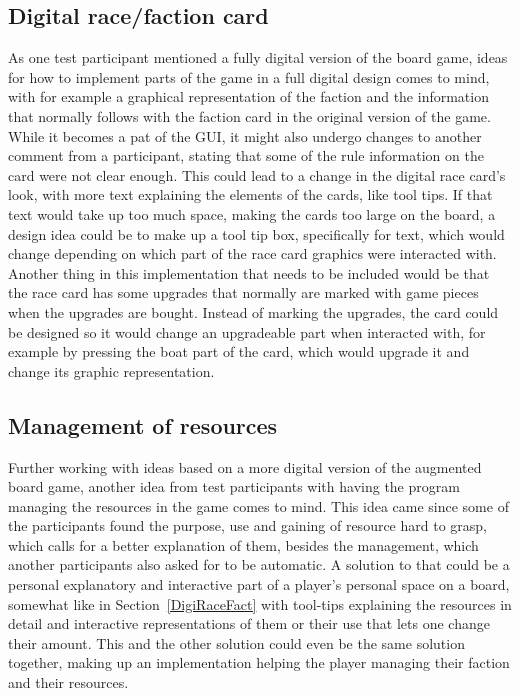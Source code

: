 \subsection{Digital race/faction card}\label{sec:DigiRaceFact}
As one test participant mentioned a fully digital version of the board game, ideas for how to implement parts of the game in a full digital design comes to mind, with for example a graphical representation of the faction and the information that normally follows with the faction card in the original version of the game. While it becomes a pat of the GUI, it might also undergo changes to another comment from a participant, stating that some of the rule information on the card were not clear enough. This could lead to a change in the digital race card's look, with more text explaining the elements of the cards, like tool tips. If that text would take up too much space, making the cards too large on the board, a design idea could be to make up a tool tip box, specifically for text, which would change depending on which part of the race card graphics were interacted with. Another thing in this implementation that needs to be included would be that the race card has some upgrades that normally are marked with game pieces when the upgrades are bought. Instead of marking the upgrades, the card could be designed so it would change an upgradeable part when interacted with, for example by pressing the boat part of the card, which would upgrade it and change its graphic representation.

\subsection{Management of resources}
Further working with ideas based on a more digital version of the augmented board game, another idea from test participants with having the program managing the resources in the game comes to mind. This idea came since some of the participants found the purpose, use and gaining of resource hard to grasp, which calls for a better explanation of them, besides the management, which another participants also asked for to be automatic. A solution to that could be a personal explanatory and interactive part of a player's personal space on a board, somewhat like in Section~\ref{DigiRaceFact} with tool-tips explaining the resources in detail and interactive representations of them or their use that lets one change their amount. This and the other solution could even be the same solution together, making up an implementation helping the player managing their faction and their resources.


